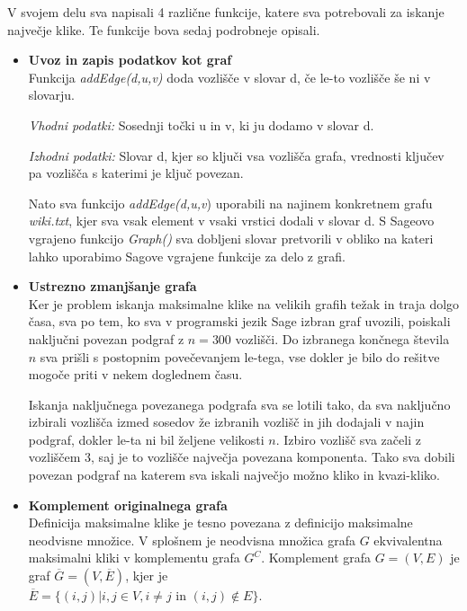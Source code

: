 \documentclass[12pt,a4paper]{amsart}
\theoremstyle{definition}
\theoremstyle{plain}
\begin{document}
V svojem delu sva napisali 4 različne funkcije, katere sva potrebovali za iskanje največje klike. Te funkcije bova sedaj podrobneje opisali.

\begin{itemize}
\item \textbf{Uvoz in zapis podatkov kot graf}
\\

Funkcija \textit{addEdge(d,u,v)} doda vozlišče v slovar d, če le-to  vozlišče še ni v slovarju. 

\textit{Vhodni podatki:} Sosednji točki u in v, ki ju dodamo v slovar d.

\textit{Izhodni podatki:} Slovar d, kjer so ključi vsa vozlišča grafa, vrednosti ključev pa vozlišča s katerimi je ključ povezan.

Nato sva funkcijo \textit{addEdge(d,u,v}) uporabili na najinem konkretnem grafu \textit{wiki.txt}, kjer sva vsak element v vsaki vrstici dodali v slovar d.
S Sageovo vgrajeno funkcijo \textit{Graph()} sva dobljeni slovar pretvorili v obliko na kateri lahko uporabimo Sagove vgrajene funkcije za delo z grafi.\\

\item \textbf{Ustrezno zmanjšanje grafa}
\\

Ker je problem iskanja maksimalne klike na velikih grafih težak in traja dolgo časa, sva po tem, ko sva v programski jezik Sage izbran graf uvozili, poiskali naključni povezan podgraf z $n = 300$ vozlišči. Do izbranega končnega števila $n$ sva prišli s postopnim povečevanjem le-tega, vse dokler je bilo do rešitve mogoče priti v nekem doglednem času. 

Iskanja naključnega povezanega podgrafa sva se lotili tako, da sva naključno izbirali vozlišča izmed sosedov že izbranih vozlišč in jih dodajali v najin podgraf, dokler le-ta ni bil željene velikosti $n$. Izbiro vozlišč sva začeli z vozliščem 3, saj je to vozlišče največja povezana komponenta. Tako sva dobili povezan podgraf na katerem sva iskali največjo možno kliko in kvazi-kliko.\\
\item \textbf{Komplement originalnega grafa}
\\

Definicija maksimalne klike je tesno povezana z definicijo maksimalne neodvisne množice. V splošnem je neodvisna množica grafa $G$ ekvivalentna maksimalni kliki v komplementu grafa $G^C$. 
Komplement grafa $G = (V, E)$ je graf $\overline{G} = (V, \overline{E})$, kjer je\\ $\overline{E} = \{(i, j) | i, j \in V, i \ne j\text{ in } (i, j) \not\in E\}$. \\


\end{itemize}
\end{document}
